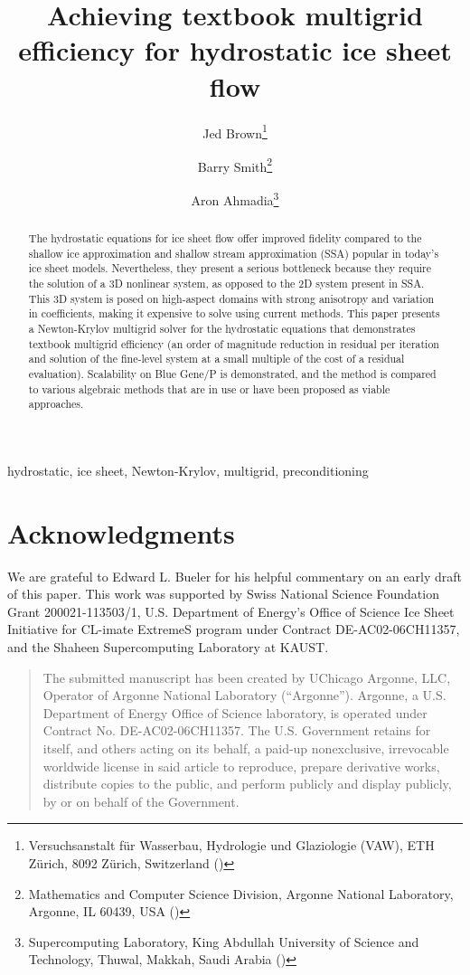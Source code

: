 \documentclass[final]{siamltex}
\title{Achieving textbook multigrid efficiency for hydrostatic ice sheet flow}
\author{%
  {Jed Brown}\thanks{Versuchsanstalt f\"ur Wasserbau, Hydrologie und Glaziologie (VAW), ETH Z\"urich, 8092 Z\"urich, Switzerland (\email{brown@vaw.baug.ethz.ch})}
  \and {Barry Smith}\thanks{Mathematics and Computer Science Division, Argonne National Laboratory, Argonne, IL 60439, USA (\email{bsmith@mcs.anl.gov})}
  \and {Aron Ahmadia}\thanks{Supercomputing Laboratory, King Abdullah University of Science and Technology, Thuwal, Makkah, Saudi Arabia (\email{aron.ahmadia@kaust.edu.sa})}}
\begin{document}
\maketitle
\begin{abstract}
The hydrostatic equations for ice sheet flow offer improved fidelity compared to the shallow ice approximation and shallow stream approximation (SSA) popular in today's ice sheet models. Nevertheless, they present a serious bottleneck because they require the solution of a 3D nonlinear system, as opposed to the 2D system present in SSA.  This 3D system is posed on high-aspect domains with strong anisotropy and variation in coefficients, making it expensive to solve using current methods.  This paper presents a Newton-Krylov multigrid solver for the hydrostatic equations that demonstrates textbook multigrid efficiency (an order of magnitude reduction in residual per iteration and solution of the fine-level system at a small multiple of the cost of a residual evaluation).  Scalability on Blue Gene/P is demonstrated, and the method is compared to various algebraic methods that are in use or have been proposed as viable approaches.
\end{abstract}
\begin{keywords}
  hydrostatic, ice sheet, Newton-Krylov, multigrid, preconditioning
\end{keywords}
\pagestyle{myheadings}
\thispagestyle{plain}



\section*{Acknowledgments}
We are grateful to Edward L. Bueler for his helpful commentary on an early draft of this paper.
This work was supported by Swiss National Science Foundation Grant 200021-113503/1, U.S. Department of Energy's Office of Science Ice Sheet Initiative for CL-imate ExtremeS program under Contract DE-AC02-06CH11357, and the Shaheen Supercomputing Laboratory at KAUST.




\bigskip
\begin{quotation}
The submitted manuscript has been created by UChicago Argonne, LLC,
Operator of Argonne National Laboratory (``Argonne'').  Argonne, a
U.S. Department of Energy Office of Science laboratory, is operated
under Contract No. DE-AC02-06CH11357.  The U.S. Government retains for
itself, and others acting on its behalf, a paid-up nonexclusive,
irrevocable worldwide license in said article to reproduce, prepare
derivative works, distribute copies to the public, and perform
publicly and display publicly, by or on behalf of the Government.
\end{quotation}
\end{document}
